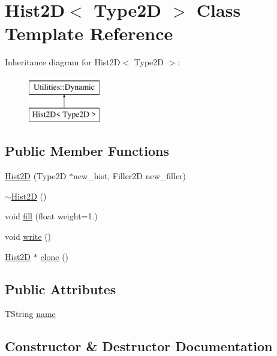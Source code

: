 \hypertarget{classHist2D}{}\section{Hist2D$<$ Type2D $>$ Class Template Reference}
\label{classHist2D}
Inheritance diagram for Hist2D$<$ Type2D $>$\+:\begin{figure}[H]
\begin{center}
\leavevmode
\includegraphics[height=2.000000cm]{classHist2D}
\end{center}
\end{figure}
\subsection*{Public Member Functions}
\begin{DoxyCompactItemize}
\item 
\hyperlink{classHist2D_a85a6f8b45d8752b1c50a3ea1c1436860}{Hist2D} (Type2D $\ast$new\+\_\+hist, Filler2D new\+\_\+filler)
\item 
\hyperlink{classHist2D_ae100dde5b1716fc0033102f3db6dece1}{$\sim$\+Hist2D} ()
\item 
void \hyperlink{classHist2D_a851f1d896300cb1962e5ac87a176cb08}{fill} (float weight=1.)
\item 
void \hyperlink{classHist2D_aea99923e54c6b1af26c2b399cf648231}{write} ()
\item 
\hyperlink{classHist2D}{Hist2D} $\ast$ \hyperlink{classHist2D_ae0326204255d619a3ec550f1086351e3}{clone} ()
\end{DoxyCompactItemize}
\subsection*{Public Attributes}
\begin{DoxyCompactItemize}
\item 
T\+String \hyperlink{classHist2D_ac84b99dc72ad3d9f85a46f7620ce1740}{name}
\end{DoxyCompactItemize}


\subsection{Constructor \& Destructor Documentation}
